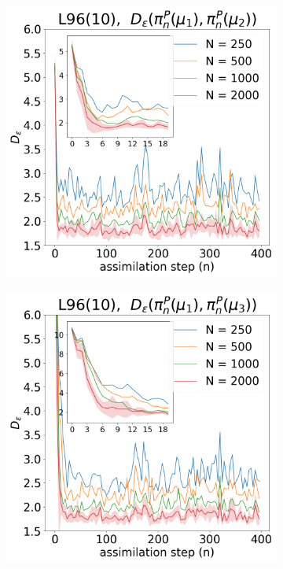 \begin{figure}[!t]
\centering
\begin{subfigure}{0.3\textwidth}
\includegraphics[width=\columnwidth]{stability/plots/figures-BPF-L96_10-1-dist_1_vs_2.png}
\end{subfigure}\hspace{0mm}%
\begin{subfigure}{0.3\textwidth}
\includegraphics[width=\columnwidth]{stability/plots/figures-BPF-L96_10-1-dist_1_vs_3.png}

\end{subfigure}
\end{figure}
